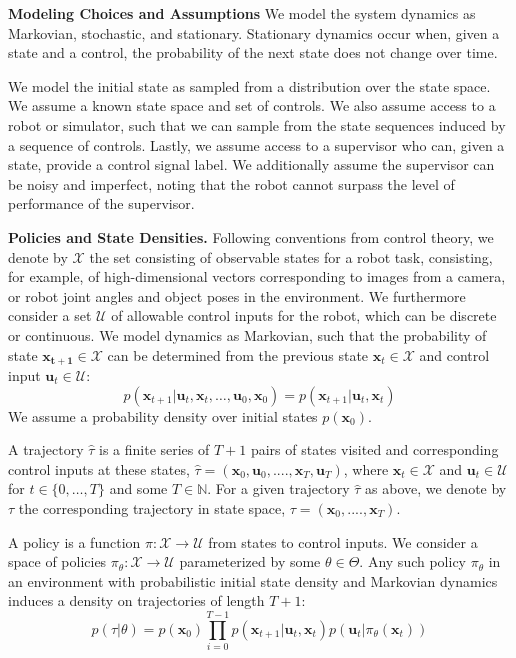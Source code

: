 \documentclass[10pt, conference]{ieeeconf}      %
\newcommand{\bu}{\mathbf{u}}
\newcommand{\bx}{\mathbf{x}}
\begin{document}
\noindent\textbf{Modeling Choices and Assumptions}  We model the system dynamics as Markovian, stochastic, and stationary. Stationary dynamics occur when, given a state and a control, the probability of the next state does not change over time. 

We model the initial state as sampled from a distribution over the state space.
We assume a known state space and set of controls. We also assume access to a robot or simulator, such that we  can sample from the state sequences induced by a sequence of controls.   Lastly, we assume access to a supervisor who can, given a state, provide a control signal label. We additionally assume the supervisor can be noisy and imperfect, noting that the robot cannot surpass the level of performance of the supervisor. 

\noindent\textbf{Policies and State Densities.}
Following conventions from control theory, we denote by $\mathcal{X}$ the set consisting of observable states for a robot task, consisting, for example, of 
high-dimensional vectors corresponding to images from a camera, or robot joint angles and object poses in the environment.
We furthermore consider a set $\mathcal{U}$ of allowable control inputs for the robot, which can be discrete or
continuous. We model dynamics as Markovian, such that the probability of state $\mathbf{x_{t+1}}\in
\mathcal{X}$ can be determined from the previous state $\mathbf{x}_t\in\mathcal{X}$ and control input $\mathbf{u}_t\in
\mathcal{U}$: 
$$p(\bx_{t+1}|\bu_{t},\bx_{t}, \ldots, \bu_{0}, \bx_{0})=p(\bx_{t+1}|\bu_{t}, \bx_t)$$
We assume a probability density over initial states $p(\bx_0)$.

A trajectory $\hat{\tau}$ is a finite series of $T+1$ pairs of states visited and corresponding
control inputs at these states, $\hat{\tau} = (\mathbf{x}_0,\mathbf{u}_0, ...., \mathbf{x}_T,\mathbf{u}_T)$, where $\bx_t\in \mathcal{X}$
and $\bu_t\in \mathcal{U}$ for $t\in \{0, \ldots, T\}$ and some $T\in \mathbb{N}$.  
For a given trajectory $\hat{\tau}$ as above, we denote by ${\tau}$ the corresponding trajectory in state space,
${\tau} = (\bx_0,....,\bx_T)$.


A policy is a function $\pi: \mathcal{X} \to \mathcal{U}$ from states to control inputs. 
We consider a space of policies $\pi_{\theta}:\mathcal{X}\to \mathcal{U}$ parameterized by some $\theta\in \Theta$. Any such policy $\pi_{\theta}$ in an environment with probabilistic initial state density and Markovian dynamics
induces a density on trajectories of length $T+1$: $$p(\tau | \theta)=
p(\bx_0)\prod_{i=0}^{T-1}p(\bx_{t+1}|\bu_t,\bx_t)p(\bu_t|\pi_{\theta}(\bx_t))$$
\end{document}
